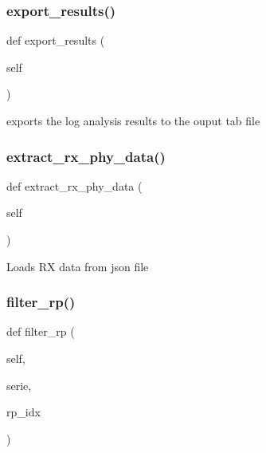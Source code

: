 \subsubsection{\texorpdfstring{export\+\_\+results()}{export\_results()}}
{\footnotesize\ttfamily def export\+\_\+results (\begin{DoxyParamCaption}\item[{}]{self }\end{DoxyParamCaption})}

\begin{DoxyVerb}exports the log analysis results to the ouput tab file\end{DoxyVerb}
 \mbox{\label{classread_r_s_s_i_1_1_r_s_s_i_a789b90763802b8501acc3429b812eb22}} 
\subsubsection{\texorpdfstring{extract\+\_\+rx\+\_\+phy\+\_\+data()}{extract\_rx\_phy\_data()}}
{\footnotesize\ttfamily def extract\+\_\+rx\+\_\+phy\+\_\+data (\begin{DoxyParamCaption}\item[{}]{self }\end{DoxyParamCaption})}

\begin{DoxyVerb}Loads RX data from json file\end{DoxyVerb}
 \mbox{\label{classread_r_s_s_i_1_1_r_s_s_i_a034043a5eeb333fe7dacf9e1f878422c}} 
\subsubsection{\texorpdfstring{filter\+\_\+rp()}{filter\_rp()}}
{\footnotesize\ttfamily def filter\+\_\+rp (\begin{DoxyParamCaption}\item[{}]{self,  }\item[{}]{serie,  }\item[{}]{rp\+\_\+idx }\end{DoxyParamCaption})}

